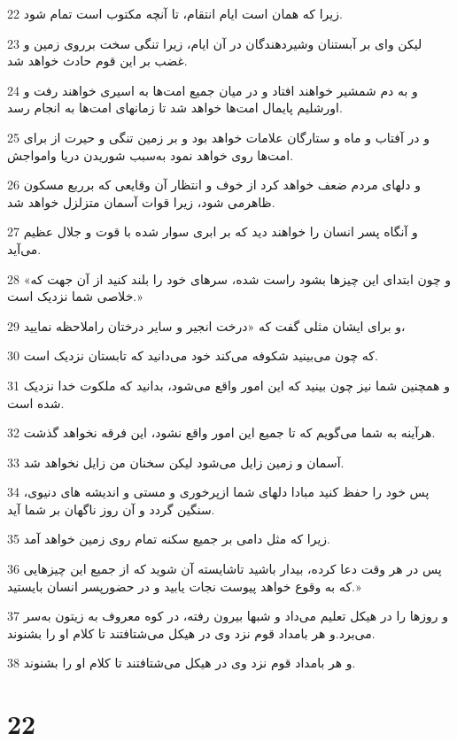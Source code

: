 \par 22 زیرا که همان است ایام انتقام، تا آنچه مکتوب است تمام شود.
\par 23 لیکن وای بر آبستنان وشیردهندگان در آن ایام، زیرا تنگی سخت برروی زمین و غضب بر این قوم حادث خواهد شد.
\par 24 و به دم شمشیر خواهند افتاد و در میان جمیع امت‌ها به اسیری خواهند رفت و اورشلیم پایمال امت‌ها خواهد شد تا زمانهای امت‌ها به انجام رسد.
\par 25 و در آفتاب و ماه و ستارگان علامات خواهد بود و بر زمین تنگی و حیرت از برای امت‌ها روی خواهد نمود به‌سبب شوریدن دریا وامواجش.
\par 26 و دلهای مردم ضعف خواهد کرد از خوف و انتظار آن وقایعی که برربع مسکون ظاهرمی شود، زیرا قوات آسمان متزلزل خواهد شد.
\par 27 و آنگاه پسر انسان را خواهند دید که بر ابری سوار شده با قوت و جلال عظیم می‌آید.
\par 28 «و چون ابتدای این چیزها بشود راست شده، سرهای خود را بلند کنید از آن جهت که خلاصی شما نزدیک است.»
\par 29 و برای ایشان مثلی گفت که «درخت انجیر و سایر درختان راملاحظه نمایید،
\par 30 که چون می‌بینید شکوفه می‌کند خود می‌دانید که تابستان نزدیک است.
\par 31 و همچنین شما نیز چون بینید که این امور واقع می‌شود، بدانید که ملکوت خدا نزدیک شده است.
\par 32 هرآینه به شما می‌گویم که تا جمیع این امور واقع نشود، این فرقه نخواهد گذشت.
\par 33 آسمان و زمین زایل می‌شود لیکن سخنان من زایل نخواهد شد.
\par 34 پس خود را حفظ کنید مبادا دلهای شما ازپرخوری و مستی و اندیشه های دنیوی، سنگین گردد و آن روز ناگهان بر شما آید.
\par 35 زیرا که مثل دامی بر جمیع سکنه تمام روی زمین خواهد آمد.
\par 36 پس در هر وقت دعا کرده، بیدار باشید تاشایسته آن شوید که از جمیع این چیزهایی که به وقوع خواهد پیوست نجات یابید و در حضورپسر انسان بایستید.»
\par 37 و روزها را در هیکل تعلیم می‌داد و شبها بیرون رفته، در کوه معروف به زیتون به‌سر می‌برد.و هر بامداد قوم نزد وی در هیکل می‌شتافتند تا کلام او را بشنوند.
\par 38 و هر بامداد قوم نزد وی در هیکل می‌شتافتند تا کلام او را بشنوند.

\chapter{22}

